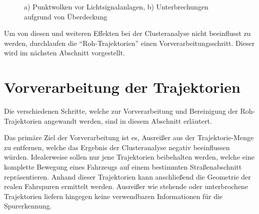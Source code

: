 \begin{figure}[H]
    \centering
    \qquad
    \caption{a) Punktwolken vor Lichtsignalanlagen, b) Unterbrechungen aufgrund von Überdeckung}
    \label{fig:real_defects_trajectories}
\end{figure}

Um von diesen und weiteren Effekten bei der Clusteranalyse nicht beeinflusst zu werden, durchlaufen die
``Roh-Trajektorien'' einen Vorverarbeitungsschritt. Dieser wird im nächsten Abschnitt vorgestellt.

\section{Vorverarbeitung der Trajektorien}
\label{sec:realisation_preprocessing}

Die verschiedenen Schritte, welche zur Vorverarbeitung und Bereinigung der Roh-Trajektorien angewandt werden,
sind in diesem Abschnitt erläutert.

Das primäre Ziel der Vorverarbeitung ist es, Ausreißer aus der
Trajektorie-Menge zu entfernen, welche das Ergebnis der Clusteranalyse negativ beeinflussen würden.
Idealerweise sollen nur jene Trajektorien beibehalten werden, welche eine komplette Bewegung eines
Fahrzeugs auf einem bestimmten Straßenabschnitt repräsentieren. Anhand dieser Trajektorien kann
anschließend die Geometrie der realen Fahrspuren ermittelt werden. Ausreißer wie stehende oder unterbrochene Trajektorien
liefern hingegen keine verwendbaren Informationen für die Spurerkennung.

